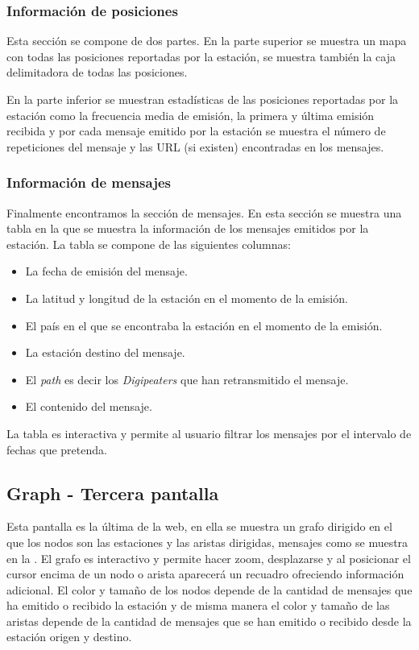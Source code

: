 \subsubsection*{Información de posiciones}
Esta sección se compone de dos partes. En la parte superior se muestra un mapa con todas las posiciones reportadas por la estación, se muestra también la caja delimitadora de todas las posiciones.

En la parte inferior se muestran estadísticas de las posiciones reportadas por la estación como la frecuencia media de emisión, la primera y última emisión recibida y por cada mensaje emitido por la estación se muestra el número de repeticiones del mensaje y las URL (si existen) encontradas en los mensajes.

\subsubsection*{Información de mensajes}
Finalmente encontramos la sección de mensajes. En esta sección se muestra una tabla en la que se muestra la información de los mensajes emitidos por la estación. La tabla se compone de las siguientes columnas:
\begin{itemize}
	\item La fecha de emisión del mensaje.
	\item La latitud y longitud de la estación en el momento de la emisión.
	\item El país en el que se encontraba la estación en el momento de la emisión.
	\item La estación destino del mensaje.
	\item El \textit{path} es decir los \textit{Digipeaters} que han retransmitido el mensaje.
	\item El contenido del mensaje.
\end{itemize}

La tabla es interactiva y permite al usuario filtrar los mensajes por el intervalo de fechas que pretenda.

\subsection{Graph - Tercera pantalla}
Esta pantalla es la última de la web, en ella se muestra un grafo dirigido en el que los nodos son las estaciones y las aristas dirigidas, mensajes como se muestra en la . El grafo es interactivo y permite hacer zoom, desplazarse y al posicionar el cursor encima de un nodo o arista aparecerá un recuadro ofreciendo información adicional. El color y tamaño de los nodos depende de la cantidad de mensajes que ha emitido o recibido la estación y de misma manera el color y tamaño de las aristas depende de la cantidad de mensajes que se han emitido o recibido desde la estación origen y destino.


